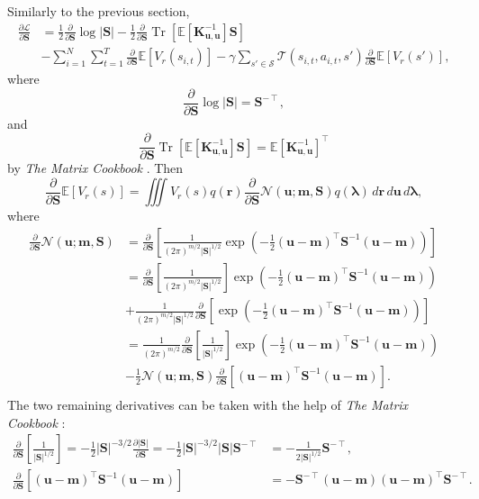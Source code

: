 \documentclass{article}
\theoremstyle{definition}
\DeclareMathOperator{\Tr}{Tr}
\newcommand{\Kuu}{\mathbf{K}_{\mathbf{u},\mathbf{u}}}
\newcommand{\dS}{\frac{\partial}{\partial\mathbf{S}}}
\begin{document}
Similarly to the previous section,
\[
  \begin{split}
    \frac{\partial\mathcal{L}}{\partial\mathbf{S}} &=
    \frac{1}{2}\dS\log|\mathbf{S}|
    -\frac{1}{2}\dS\Tr[\mathbb{E}[\Kuu^{-1}]\mathbf{S}] \\
    &- \sum_{i=1}^N \sum_{t=1}^T \dS\mathbb{E}[V_r(s_{i,t})] -
      \gamma\sum_{s' \in \mathcal{S}} \mathcal{T}(s_{i,t}, a_{i,t},
      s')\dS\mathbb{E}[V_r(s')],
  \end{split}
\]
where
\[ \dS\log|\mathbf{S}| = \mathbf{S}^{-\intercal}, \]
and
\[ \dS\Tr[\mathbb{E}[\Kuu^{-1}]\mathbf{S}] = \mathbb{E}[\Kuu^{-1}]^\intercal \]
by \emph{The Matrix Cookbook} \cite{petersen2008matrix}. Then
\[ \dS\mathbb{E}[V_r(s)] = \iiint V_r(s) q(\mathbf{r}) \dS\mathcal{N}(\mathbf{u}; \mathbf{m}, \mathbf{S})
  q(\bm\lambda)\,d\mathbf{r}\,d\mathbf{u}\,d\bm\lambda, \]
where
\[
  \begin{split}
    \dS\mathcal{N}(\mathbf{u}; \mathbf{m}, \mathbf{S}) &=
    \dS\left[\frac{1}{(2\pi)^{m/2}|\mathbf{S}|^{1/2}}\exp \left( -\frac{1}{2}
        (\mathbf{u} - \mathbf{m})^\intercal\mathbf{S}^{-1}(\mathbf{u} -
        \mathbf{m})\right)\right] \\
    &= \dS\left[\frac{1}{(2\pi)^{m/2}|\mathbf{S}|^{1/2}}\right]\exp \left( -\frac{1}{2}
        (\mathbf{u} - \mathbf{m})^\intercal\mathbf{S}^{-1}(\mathbf{u} -
        \mathbf{m})\right) \\
      &+ \frac{1}{(2\pi)^{m/2}|\mathbf{S}|^{1/2}}\dS\left[\exp\left( -\frac{1}{2}
        (\mathbf{u} - \mathbf{m})^\intercal\mathbf{S}^{-1}(\mathbf{u} -
        \mathbf{m})\right)\right] \\
    &=
    \frac{1}{(2\pi)^{m/2}}\dS\left[\frac{1}{|\mathbf{S}|^{1/2}}\right]\exp
    \left( -\frac{1}{2} (\mathbf{u} -
      \mathbf{m})^\intercal\mathbf{S}^{-1}(\mathbf{u} - \mathbf{m})\right) \\
    &- \frac{1}{2}\mathcal{N}(\mathbf{u}; \mathbf{m}, \mathbf{S})\dS[(\mathbf{u}
    - \mathbf{m})^\intercal\mathbf{S}^{-1}(\mathbf{u} - \mathbf{m})]. \\
  \end{split}
\]
The two remaining derivatives can be taken with the help of \emph{The Matrix
  Cookbook} \cite{petersen2008matrix}:
\begin{align*}
  \dS\left[\frac{1}{|\mathbf{S}|^{1/2}}\right] =
  -\frac{1}{2}|\mathbf{S}|^{-3/2}\frac{\partial |\mathbf{S}|}{\partial \mathbf{S}} =
  -\frac{1}{2}|\mathbf{S}|^{-3/2}|\mathbf{S}|\mathbf{S}^{-\intercal} &=
  -\frac{1}{2|\mathbf{S}|^{1/2}}\mathbf{S}^{-\intercal}, \\
  \dS[(\mathbf{u} - \mathbf{m})^\intercal\mathbf{S}^{-1}(\mathbf{u} -
  \mathbf{m})] &= -\mathbf{S}^{-\intercal}(\mathbf{u} - \mathbf{m})(\mathbf{u} -
  \mathbf{m})^\intercal\mathbf{S}^{-\intercal}.
\end{align*}
\end{document}

